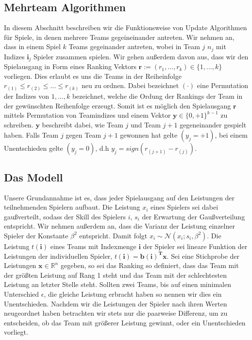 \documentclass[12pt,a4paper]{scrartcl}
\numberwithin{equation}{section}
\newcommand{\R}{\mathbb{R}} %
\begin{document}
   
   \subsection{Mehrteam Algorithmen}
   
   In diesem Abschnitt beschreiben wir die Funktionsweise von Update Algorithmen für Spiele, in denen mehrere 
   Teams gegeineinander antreten. 
   Wir nehmen an, dass in einem Spiel $k$ Teams gegeinander antreten, wobei in Team $j$ $n_j$ mit Indizes $\mathbf{i}_j$ Spieler zusammen
   spielen. Wir gehen außerdem davon aus, dass wir den Spielausgang in Form eines Ranking Vektors
   $\mathbf{r} := (r_1,...,r_k) \in \{1,...,k\}$ vorliegen. Dies erlaubt es uns die Teams in der Reiheinfolge
   $ r_{(1)} \leq r_{(2)} \leq ... \leq r_{(k)}$ neu zu ordnen. Dabei bezeichnet $( \cdot )$ eine Permutation 
   der Indizes von $1,...,k$ bezeichnet, welche die Ordung der Rankings der Team in der gewünschten Reihenfolge
   erzeugt. Somit ist es möglich den Spielausgang $\mathbf{r}$ mittels Permutation von Teamindizes und einem Vektor 
   $\mathbf{y} \in \{0, +1\}^{k-1}$ zu schreiben. $\mathbf{y}$ beschreibt dabei, wie Team $j$ und Team $j+1$ gegeneinander
   gespielt haben. Falls  Team $j$ gegen Team $j+1$ gewonnen hat gelte $(y_j = +1)$, bei einem Unentschieden gelte 
   $(y_j = 0)$, d.h $y_j = sign(r_{(j+1)} - r_{(j)})$.
   
   \subsection{Das Modell}
   
   Unsere Grundannahme ist es, dass jeder Spielausgang auf den Leistungen der teilnehmenden Spielern aufbaut. Die 
   Leistung $x_i$ eines Spielers sei dabei gaußverteilt, sodass der Skill des Spielers $i$, $s_i$ der Erwartung der Gaußverteilung entspricht. 
   Wir nehmen außerdem an, dass die Varianz der Leistung einzelner Spieler der Konstante $\beta^2$ entspricht. Damit folgt $x_i \sim \mathcal{N}(x_i; s_i, \beta^2)$.
   Die Leistung $t(\mathbf{i})$ eines Teams mit Indexmenge $\mathbf{i}$ der Spieler sei lineare Funktion der Leistungen der individuellen Spieler, $t(\mathbf{i}) = \mathbf{b(i)^T x}$.
   Sei eine Stichprobe der Leistungen $\mathbf{x} \in \R^n$ gegeben, so sei das Ranking so definiert, dass das Team mit der größten Leistung auf Rang 1 steht und das Team mit der
   schlechtesten Leistung an letzter Stelle steht. Sollten zwei Teams, bis auf einen minimalen Unterschied $\epsilon$, die gleiche Leistung erbracht haben so nennen wir dies ein Unentschieden.
   Nachdem wir die Leistungen der Spieler nach ihren Werten neugeordnet haben betrachten wir stets nur die paarweise Differenz, um zu entscheiden, ob das Team mit größerer Leistung
   gewinnt, oder ein Unentschieden vorliegt. \\
   
\end{document}
